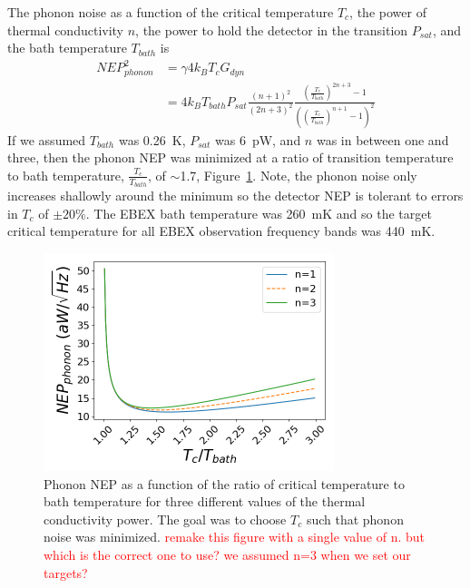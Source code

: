 The phonon noise as a function of the critical temperature $T_{c}$, the power of thermal conductivity $n$,  the power to hold the detector in the transition $P_{sat}$, and the bath temperature $T_{bath}$ is
\begin{equation}
\label{eq:phonon_nep}
\begin{split}
NEP_{phonon}^2 & = \gamma4k_{B}T_{c}G_{dyn} \\
& = 4k_{B}T_{bath}P_{sat}\frac{(n+1)^{2}}{(2n+3)^2}\frac{\left(\frac{T_{c}}{T_{bath}}\right)^{2n+3}-1}{\left( \left(\frac{T_{c}}{T_{bath}}\right)^{n+1}-1\right)^{2}}
\end{split}
\end{equation}
If we assumed $T_{bath}$ was 0.26~K, $P_{sat}$ was 6~pW, and $n$ was in between one and three, then the phonon \ac{NEP} was minimized at a ratio of transition temperature to bath temperature, $\frac{T_{c}}{T_{bath}}$, of $\sim$1.7, Figure~\ref{fig:phonon_nep_vs_temps}. 
Note, the phonon noise only increases shallowly around the minimum so the detector \ac{NEP} is tolerant to errors in $T_{c}$ of $\pm20\%$.
The \ac{EBEX} bath temperature was 260~mK and so the target critical temperature for all \ac{EBEX} observation frequency bands was 440~mK.

\begin{figure}[htp]
\begin{center}
\includegraphics[height=2.5in]{figures/phonon_nep_vs_temperature.png}
\caption{Phonon \ac{NEP} as a function of the ratio of critical temperature to bath temperature for three different values of the thermal conductivity power. The goal was to choose $T_{c}$ such that phonon noise was minimized. \textcolor{red}{remake this figure with a single value of n. but which is the correct one to use? we assumed n=3 when we set our targets?}
\label{fig:phonon_nep_vs_temps} }
\end{center}
\end{figure}

